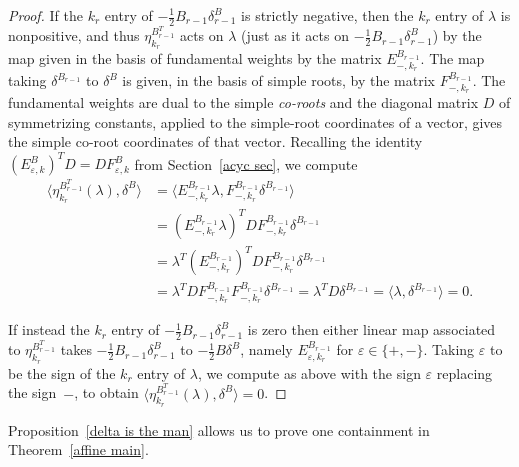 \documentclass{amsart}
\theoremstyle{definition}
\theoremstyle{remark}
\numberwithin{equation}{section}
\newcommand{\ep}{\varepsilon}
\newcommand{\set}[1]{{\lbrace #1 \rbrace}}
\newcommand{\br}[1]{{\langle #1 \rangle}}
\newcommand{\0}{{\mathbf{0}}}
\newcommand{\symmetrizer}{{D}}
\begin{document}
\begin{proof}
If the $k_r$ entry of $-\frac12B_{r-1}\delta^B_{r-1}$ is strictly negative, then the $k_r$ entry of $\lambda$ is nonpositive, and thus $\eta^{B^T_{r-1}}_{k_r}$ acts on $\lambda$ (just as it acts on $-\frac12B_{r-1}\delta^B_{r-1}$) by the map given in the basis of fundamental weights by the matrix $E_{-,k_r}^{B_{r-1}}$.
The map taking $\delta^{B_{r-1}}$ to $\delta^B$ is given, in the basis of simple roots, by the matrix $F_{-,k_r}^{B_{r-1}}$.
The fundamental weights are dual to the simple \emph{co-roots} and the diagonal matrix $\symmetrizer$ of symmetrizing constants, applied to the simple-root coordinates of a vector, gives the simple co-root coordinates of that vector.
Recalling the identity $(E_{\ep,k}^B)^T\symmetrizer=\symmetrizer F_{\ep,k}^B$ from Section~\ref{acyc sec}, we compute
\begin{align*}
\br{\eta^{B^T_{r-1}}_{k_r}(\lambda),\delta^B}
&=\br{E_{-,k_r}^{B_{r-1}}\lambda,F_{-,k_r}^{B_{r-1}}\delta^{B_{r-1}}}\\
&=(E_{-,k_r}^{B_{r-1}}\lambda)^T\symmetrizer F_{-,k_r}^{B_{r-1}}\delta^{B_{r-1}}\\
&=\lambda^T(E_{-,k_r}^{B_{r-1}})^T\symmetrizer F_{-,k_r}^{B_{r-1}}\delta^{B_{r-1}}\\
&=\lambda^T\symmetrizer F_{-,k_r}^{B_{r-1}}F_{-,k_r}^{B_{r-1}}\delta^{B_{r-1}}=\lambda^T\symmetrizer\delta^{B_{r-1}}=\br{\lambda,\delta^{B_{r-1}}}=0.
\end{align*}

If instead the $k_r$ entry of $-\frac12B_{r-1}\delta^B_{r-1}$ is zero then either linear map associated to $\eta^{B^T_{r-1}}_{k_r}$ takes $-\frac12B_{r-1}\delta^B_{r-1}$ to $-\frac12B\delta^B$, namely $E_{\ep,k_r}^{B_{r-1}}$ for $\ep\in\set{+,-}$.
Taking $\ep$ to be the sign of the $k_r$ entry of $\lambda$, we compute as above with the sign $\ep$ replacing the sign~$-$, to obtain $\br{\eta^{B^T_{r-1}}_{k_r}(\lambda),\delta^B}=0$.
\end{proof}

Proposition~\ref{delta is the man} allows us to prove one containment in Theorem~\ref{affine main}.
\end{document}
